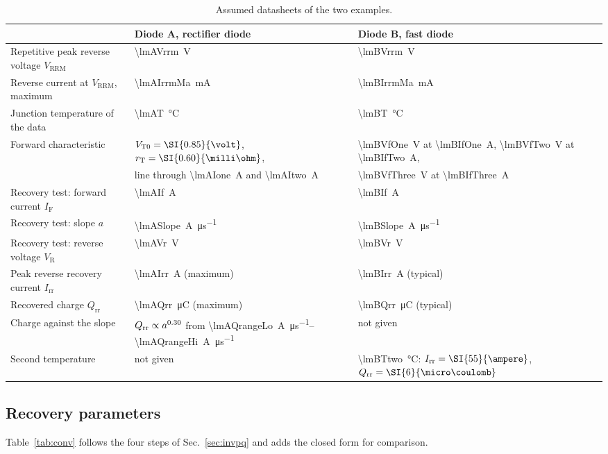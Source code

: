 \documentclass[10pt,a4paper]{scrartcl}
\newcommand{\IF}{I_\mathrm{F}}
\newcommand{\VR}{V_\mathrm{R}}
\newcommand{\Irr}{I_\mathrm{rr}}
\newcommand{\Qrr}{Q_\mathrm{rr}}
\newcommand{\VTo}{V_\mathrm{T0}}
\newcommand{\rT}{r_\mathrm{T}}
\newcommand{\Vrrm}{V_\mathrm{RRM}}
\begin{document}
\begin{table}[htb]
\centering\small
\caption{Assumed datasheets of the two examples.}
\label{tab:data}
\begin{tabular}{@{}lll@{}}
\toprule
 & Diode A, rectifier diode & Diode B, fast diode \\
\midrule
Repetitive peak reverse voltage $\Vrrm$ & \SI{\lmAVrrm}{\volt} & \SI{\lmBVrrm}{\volt} \\
Reverse current at $\Vrrm$, maximum & \SI{\lmAIrrmMa}{\milli\ampere} & \SI{\lmBIrrmMa}{\milli\ampere} \\
Junction temperature of the data & \SI{\lmAT}{\celsius} & \SI{\lmBT}{\celsius} \\
Forward characteristic & $\VTo = \SI{\lmAVto}{\volt}$, $\rT = \SI{\lmARt}{\milli\ohm}$, & \SI{\lmBVfOne}{\volt} at \SI{\lmBIfOne}{\ampere}, \SI{\lmBVfTwo}{\volt} at \SI{\lmBIfTwo}{\ampere}, \\
 & line through \SI{\lmAIone}{\ampere} and \SI{\lmAItwo}{\ampere} & \SI{\lmBVfThree}{\volt} at \SI{\lmBIfThree}{\ampere} \\
Recovery test: forward current $\IF$ & \SI{\lmAIf}{\ampere} & \SI{\lmBIf}{\ampere} \\
Recovery test: slope $a$ & \SI{\lmASlope}{\ampere\per\micro\second} & \SI{\lmBSlope}{\ampere\per\micro\second} \\
Recovery test: reverse voltage $\VR$ & \SI{\lmAVr}{\volt} & \SI{\lmBVr}{\volt} \\
Peak reverse recovery current $\Irr$ & \SI{\lmAIrr}{\ampere} (maximum) & \SI{\lmBIrr}{\ampere} (typical) \\
Recovered charge $\Qrr$ & \SI{\lmAQrr}{\micro\coulomb} (maximum) & \SI{\lmBQrr}{\micro\coulomb} (typical) \\
Charge against the slope & $\Qrr \propto a^{\lmAQexp}$ from \SIrange{\lmAQrangeLo}{\lmAQrangeHi}{\ampere\per\micro\second} & not given \\
Second temperature & not given & \SI{\lmBTtwo}{\celsius}: $\Irr = \SI{\lmBIrrTtwo}{\ampere}$, $\Qrr = \SI{\lmBQrrTtwo}{\micro\coulomb}$ \\
\bottomrule
\end{tabular}
\end{table}

\subsection{Recovery parameters}
\label{sec:exrec}
Table~\ref{tab:conv} follows the four steps of Sec.~\ref{sec:invpq} and adds the closed form for comparison.
\end{document}
